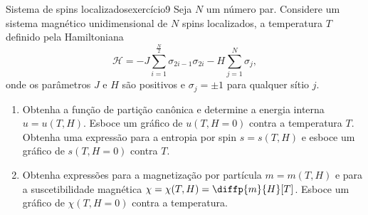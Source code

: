 \begin{exercício}{Sistema de spins localizados}{exercício9}
    Seja \(N\) um número par. Considere um sistema magnético unidimensional de \(N\) spins localizados, a temperatura \(T\) definido pela Hamiltoniana
    \begin{equation*}
        \mathcal{H} = -J \sum_{i = 1}^{\frac{N}{2}} \sigma_{2i-1}\sigma_{2i} - H \sum_{j=1}^{N} \sigma_j,
    \end{equation*}
    onde os parâmetros \(J\) e \(H\) são positivos e \(\sigma_j = \pm 1\) para qualquer sítio \(j\).
    \begin{enumerate}[label=(\alph*)]
        \item Obtenha a função de partição canônica e determine a energia interna \(u = u(T, H)\). Esboce um gráfico de \(u(T, H = 0)\) contra a temperatura \(T\). Obtenha uma expressão para a entropia por spin \(s = s(T, H)\) e esboce um gráfico de \(s(T, H = 0)\) contra \(T\).
        \item Obtenha expressões para a magnetização por partícula \(m = m(T, H)\) e para a suscetibilidade magnética \(\chi = \chi(T, H) = \diffp{m}{H}[T]\). Esboce um gráfico de \(\chi(T, H = 0)\) contra a temperatura.
    \end{enumerate}
\end{exercício}
